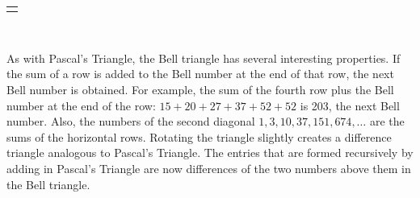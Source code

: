 \documentclass[10pt,]{book}
\theoremstyle{plain}
\theoremstyle{definition}
\theoremstyle{definition}
\numberwithin{equation}{chapter}
\newlength{\panelmax}
\begin{document}
{%
\setlength{\panelmax}{0pt}
\ifdefined\panelboxAtabular\else\newsavebox{\panelboxAtabular}\fi%
\ifdefined\phAtabular\else\newlength{\phAtabular}\fi%
\setlength{\phAtabular}{\ht\panelboxAtabular+\dp\panelboxAtabular}
\settototalheight{\phAtabular}{\usebox{\panelboxAtabular}}
\setlength{\panelmax}{\maxof{\panelmax}{\phAtabular}}
\leavevmode%
\setlength{\tabcolsep}{0\linewidth}
\par\medskip\noindent
\hspace*{0.15\linewidth}%
\begin{tabular}{@{}*{1}{c}@{}}
\begin{minipage}[c][\panelmax][t]{0.7\linewidth}\usebox{\panelboxAtabular}\end{minipage}\end{tabular}\\
}%
\par
\hypertarget{p-158}{}%
As with Pascal's Triangle, the Bell triangle has several interesting properties. If the sum of a row is added to the Bell number at the end of that row, the next Bell number is obtained. For example, the sum of the fourth row plus the Bell number at the end of the row: \(15 + 20 + 27 + 37 + 52 + 52\) is 203, the next Bell number. Also, the numbers of the second diagonal \(1, 3, 10, 37, 151, 674, \ldots\) are the sums of the horizontal rows. Rotating the triangle slightly creates a difference triangle analogous to Pascal's Triangle. The entries that are formed recursively by adding in Pascal's Triangle are now differences of the two numbers above them in the Bell triangle.%
\end{document}
